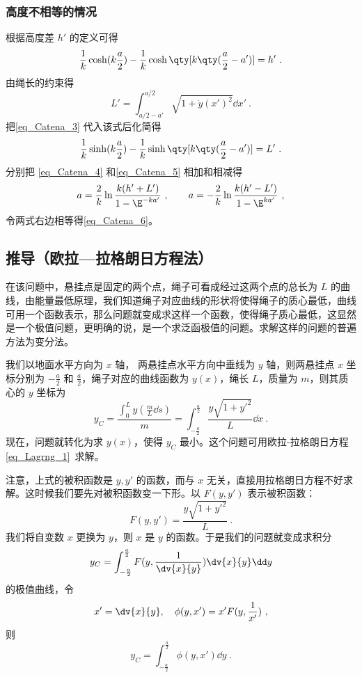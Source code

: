 \subsubsection{高度不相等的情况}
根据高度差 $h'$ 的定义可得
\begin{equation}\label{eq_Catena_4}
\frac{1}{k}\cosh(k\frac{a}{2}) - \frac{1}{k}\cosh\qty[k\qty(\frac{a}{2}-a')] = h'~.
\end{equation}
由绳长的约束得
\begin{equation}
L' = \int_{a/2-a'}^{a/2} \sqrt{1 + \dot y(x')^2} \dd{x'}~.
\end{equation}
把\autoref{eq_Catena_3} 代入该式后化简得
\begin{equation}\label{eq_Catena_5}
\frac{1}{k}\sinh(k\frac{a}{2}) - \frac{1}{k}\sinh\qty[k\qty(\frac{a}{2}-a')] = L'~.
\end{equation}
分别把 \autoref{eq_Catena_4} 和\autoref{eq_Catena_5} 相加和相减得
\begin{equation}
a = \frac{2}{k} \ln\frac{k(h'+L')}{1 - \E^{-ka'}}~,
\qquad
a = -\frac{2}{k} \ln\frac{k(h'-L')}{1 - \E^{ka'}}~,
\end{equation}
令两式右边相等得\autoref{eq_Catena_6}。

\subsection{推导（欧拉—拉格朗日方程法）}
在该问题中，悬挂点是固定的两个点，绳子可看成经过这两个点的总长为 $L$ 的曲线，由能量最低原理，我们知道绳子对应曲线的形状将使得绳子的质心最低，曲线可用一个函数表示，那么问题就变成求这样一个函数，使得绳子质心最低，这显然是一个极值问题，更明确的说，是一个求泛函极值的问题。求解这样的问题的普遍方法为变分法。

我们以地面水平方向为 $x$ 轴， 两悬挂点水平方向中垂线为 $y$ 轴，则两悬挂点 $x$ 坐标分别为 $-\frac{a}{2}$ 和 $\frac{a}{2}$，绳子对应的曲线函数为 $y(x)$，绳长 $L$，质量为 $m$，则其质心的 $y$ 坐标为
\begin{equation}
y_C=\frac{\int_{0}^{L}y(\frac{m}{L}\dd s)}{m}=\int_{-\frac{a}{2}}^{\frac{a}{2}} \frac{y\sqrt{1+y'^2}}{L}\dd x~.
\end{equation}
现在，问题就转化为求 $y(x)$，使得 $y_C$ 最小。这个问题可用欧拉-拉格朗日方程\autoref{eq_Lagrng_1}~求解。

注意，上式的被积函数是 $y,y'$ 的函数，而与 $x$ 无关，直接用拉格朗日方程不好求解。这时候我们要先对被积函数变一下形。以 $F(y,y')$ 表示被积函数： 
\begin{equation}\label{eq_Catena_05}
F(y,y')=\frac{y\sqrt{1+y'^2}}{L}~.
\end{equation}
我们将自变数 $x$ 更换为 $y$，则 $x$ 是 $y$ 的函数。于是我们的问题就变成求积分
\begin{equation}
y_C=\int_{-\frac{a}{2}}^{\frac{a}{2}} F(y,\frac{1}{\dv {x}{y} })\dv{x}{y}\dd y
\end{equation}
的极值曲线，令 
\begin{equation}\label{eq_Catena_9}
x'=\dv{x}{y},\quad \phi(y,x')=x'F(y,\frac{1}{x'})~,
\end{equation}
则
\begin{equation}
y_C=\int_{-\frac{a}{2}}^{\frac{a}{2}} \phi(y,x')\dd y~.
\end{equation}

